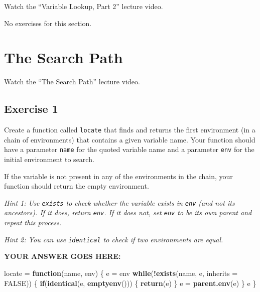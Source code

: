 \documentclass[
]{article}
\newenvironment{Shaded}{\begin{snugshade}}{\end{snugshade}}
\newcommand{\ControlFlowTok}[1]{\textcolor[rgb]{0.13,0.29,0.53}{\textbf{#1}}}
\newcommand{\DataTypeTok}[1]{\textcolor[rgb]{0.13,0.29,0.53}{#1}}
\newcommand{\KeywordTok}[1]{\textcolor[rgb]{0.13,0.29,0.53}{\textbf{#1}}}
\newcommand{\NormalTok}[1]{#1}
\newcommand{\OperatorTok}[1]{\textcolor[rgb]{0.81,0.36,0.00}{\textbf{#1}}}
\newcommand{\OtherTok}[1]{\textcolor[rgb]{0.56,0.35,0.01}{#1}}
\newcommand{\StringTok}[1]{\textcolor[rgb]{0.31,0.60,0.02}{#1}}
\begin{document}
Watch the ``Variable Lookup, Part 2'' lecture video.

No exercises for this section.

\hypertarget{the-search-path}{%
\section{The Search Path}\label{the-search-path}}

Watch the ``The Search Path'' lecture video.

\hypertarget{exercise-1}{%
\subsection{Exercise 1}\label{exercise-1}}

Create a function called \texttt{locate} that finds and returns the
first environment (in a chain of environments) that contains a given
variable name. Your function should have a parameter \texttt{name} for
the quoted variable name and a parameter \texttt{env} for the initial
environment to search.

If the variable is not present in any of the environments in the chain,
your function should return the empty environment.

\emph{Hint 1: Use \texttt{exists} to check whether the variable exists
in \texttt{env} (and not its ancestors). If it does, return
\texttt{env}. If it does not, set \texttt{env} to be its own parent and
repeat this process.}

\emph{Hint 2: You can use \texttt{identical} to check if two
environments are equal.}

\textbf{YOUR ANSWER GOES HERE:}

\begin{Shaded}
\begin{Highlighting}[]
\NormalTok{locate =}\StringTok{ }\ControlFlowTok{function}\NormalTok{(name, env) \{}
\NormalTok{   e =}\StringTok{ }\NormalTok{env}
   \ControlFlowTok{while}\NormalTok{(}\OperatorTok{!}\KeywordTok{exists}\NormalTok{(name, e, }\DataTypeTok{inherits =} \OtherTok{FALSE}\NormalTok{)) \{}
      \ControlFlowTok{if}\NormalTok{(}\KeywordTok{identical}\NormalTok{(e, }\KeywordTok{emptyenv}\NormalTok{())) \{}
         \KeywordTok{return}\NormalTok{(e)}
\NormalTok{      \}}
\NormalTok{      e =}\StringTok{ }\KeywordTok{parent.env}\NormalTok{(e)}
\NormalTok{   \}}
\NormalTok{   e}
\NormalTok{\}}
\end{Highlighting}
\end{Shaded}
\end{document}
